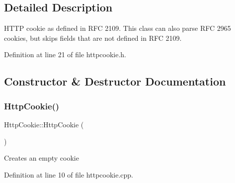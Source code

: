 \subsection{Detailed Description}
H\+T\+TP cookie as defined in R\+FC 2109. This class can also parse R\+FC 2965 cookies, but skips fields that are not defined in R\+FC 2109. 

Definition at line 21 of file httpcookie.\+h.



\subsection{Constructor \& Destructor Documentation}
\mbox{\label{classstefanfrings_1_1_http_cookie_acd5da17724e0fdee1ea706214f744d32}} 
\subsubsection{\texorpdfstring{Http\+Cookie()}{HttpCookie()}\hspace{0.1cm}{\footnotesize\ttfamily [1/3]}}
{\footnotesize\ttfamily Http\+Cookie\+::\+Http\+Cookie (\begin{DoxyParamCaption}{ }\end{DoxyParamCaption})}

Creates an empty cookie 

Definition at line 10 of file httpcookie.\+cpp.

\mbox{\label{classstefanfrings_1_1_http_cookie_af4dcaf6831807da172529127c1d3f28e}} 
